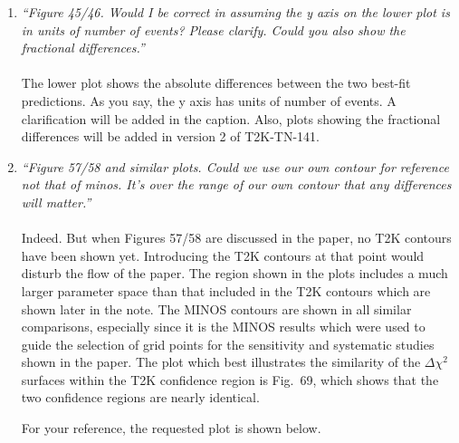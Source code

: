 \begin{enumerate}
Also it should be noted that all parameter correlations are fully taken into account 
when the toy MC experiments are generated, and this is true for all fit methods.

\vspace{5 mm}
\item
{\em
  ``Figure 45/46. Would I be correct in assuming the y axis on the lower plot is in units 
  of number of events? Please clarify. Could you also show the fractional differences.''
}\\
\\
The lower plot shows the absolute differences between the two best-fit predictions.
As you say, the y axis has units of number of events.
A clarification will be added in the caption.
Also, plots showing the fractional differences will be added in version 2 of T2K-TN-141.

\vspace{5 mm}
\item
{\em
  ``Figure 57/58 and similar plots. Could we use our own contour for reference not that of minos. 
  It's over the range of our own contour that any differences will matter.''
}\\
\\
Indeed. 
But when Figures 57/58 are discussed in the paper, no T2K contours have been shown yet.
Introducing the T2K contours at that point would disturb the flow of the paper.
The region shown in the plots includes a much larger parameter space than that included 
in the T2K contours which are shown later in the note.
The MINOS contours are shown in all similar comparisons,
especially since it is the MINOS results which were used to guide the selection 
of grid points for the sensitivity and systematic studies shown in the paper.
The plot which best illustrates the similarity of the $\Delta\chi^2$ surfaces within 
the T2K confidence region is Fig.\ 69, which shows that the two
confidence regions are nearly identical.

For your reference, the requested plot is shown below.


\end{enumerate}
